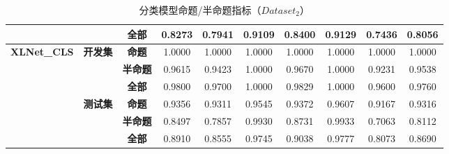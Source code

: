 \documentclass[11pt]{article}
\begin{document}
\begin{CJK}{UTF8}{gkai}
\begin{table}[htbp]
\begin{tabular}{cccccccccc}
      &       & \textbf{全部} & 0.8273  & 0.7941  & 0.9109  & 0.8400  & 0.9129  & 0.7436  & 0.8056  \\
      \hline
      \multicolumn{1}{c}{\multirow{6}[0]{*}{\textbf{XLNet\_CLS}}} & \multicolumn{1}{c}{\multirow{3}[0]{*}{\textbf{开发集}}} & \textbf{命题} & 1.0000  & 1.0000  & 1.0000  & 1.0000  & 1.0000  & 1.0000  & 1.0000  \\
      &       & \textbf{半命题} & 0.9615  & 0.9423  & 1.0000  & 0.9670  & 1.0000  & 0.9231  & 0.9538  \\
      &       & \textbf{全部} & 0.9800  & 0.9700  & 1.0000  & 0.9829  & 1.0000  & 0.9600  & 0.9760  \\
      \cline{2-10}
      & \multicolumn{1}{c}{\multirow{3}[0]{*}{\textbf{测试集}}} & \textbf{命题} & 0.9356  & 0.9311  & 0.9545  & 0.9372  & 0.9607  & 0.9167  & 0.9316  \\
      &       & \textbf{半命题} & 0.8497  & 0.7857  & 0.9930  & 0.8731  & 0.9933  & 0.7063  & 0.8112  \\
      &       & \textbf{全部} & 0.8910  & 0.8555  & 0.9745  & 0.9038  & 0.9777  & 0.8073  & 0.8690  \\
      \hline
    \end{tabular}%
    \caption{分类模型命题/半命题指标（$Dataset_2$）}
  \label{tab:addlabel}%
\end{table}%


\end{CJK}
\end{document}
